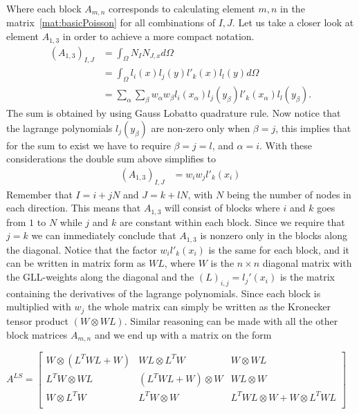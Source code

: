 Where each block $A_{m,n}$ corresponds to  calculating element $m,n$ in the matrix~\ref{mat:basicPoisson} for all combinations of $I,J$. Let us take a closer look at element $A_{1,3}$ in order to achieve a more compact notation. 
\begin{align}
	(A_{1,3})_{I,J} &= \int_{\Omega} N_I N_{J,x} d\Omega \\
	&= \int_{\Omega} l_i(x)l_j(y)l'_k(x)l_l(y) d\Omega \\
	&= \sum_{\alpha}\sum_{\beta} w_{\alpha}w_{\beta}l_i(x_{\alpha})l_j(y_{\beta})l'_k(x_{\alpha})l_l(y_{\beta}).
	\label{eq:MatrixDerivation}
\end{align}
The sum is obtained by using Gauss Lobatto quadrature rule. Now notice that the lagrange polynomials $l_j(y_{\beta})$ are non-zero only when $\beta = j$, this implies that for the sum to exist we have to require $\beta = j=l$, and $\alpha = i$. With these considerations the double sum above simplifies to  
\begin{align}
	(A_{1,3})_{I,J} &= w_{i}w_{j}l'_k(x_{i})
	\label{eq:MatrixDerivation2}
\end{align}
Remember that $I = i+jN$ and $J = k+lN$, with $N$ being the number of nodes in each direction. This means that $A_{1,3}$ will consist of blocks where $i$ and $k$ goes from $1$ to $N$ while $j$ and $k$ are constant within each block. Since we require that $j=k$ we can immediately conclude that $A_{1,3}$ is nonzero only in the blocks along the diagonal. Notice that the factor $w_il'_k(x_i)$ is the same for each block, and it can be written in matrix form as $WL$, where $W$ is the $n \times n$ diagonal matrix with the GLL-weights along the diagonal and the $(L)_{i,j}= l_j'(x_i)$ is the matrix containing the derivatives of the lagrange polynomials. Since each block is multiplied with $w_j$ the whole matrix can simply be written as the Kronecker tensor product $(W\otimes WL)$. Similar reasoning can be made with all the other block matrices $A_{m,n}$ and we end up with a matrix on the form

%
$
A^{LS} = 
\begin{bmatrix}
	W \otimes (L^TWL+W) & WL \otimes L^TW 		 &	W \otimes WL  \\ 	
	L^TW \otimes WL     & (L^TWL+W) \otimes W  &	WL \otimes W  \\ 	
	W \otimes L^TW		  & L^TW \otimes W       &  L^TWL \otimes W +	W\otimes L^TWL  \\ 	
\end{bmatrix}
$

